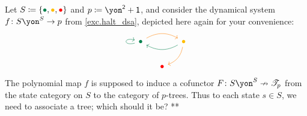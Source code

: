 \documentclass[Book-Poly]{subfiles}
\begin{document}
\begin{example}\label{ex.cofree_dyn_sys}
Let $S\coloneqq\{\bul[dgreen],\bul[dyellow],\bul[red]\}$ and $p\coloneqq\yon^\2+\1$, and consider the dynamical system $f\colon S\yon^S\to p$ from \cref{exc.halt_dsa}, depicted here again for your convenience:
\[
\begin{tikzcd}[column sep=small]
	\bul[dgreen]\ar[rr, bend left, orange]\ar[loop left, dgreen]&&
	\bul[dyellow]\ar[dl, bend left, orange]\ar[ll, dgreen, bend left]\\&
	\bul[red]
\end{tikzcd}
\]
The polynomial map $f$ is supposed to induce a cofunctor $F\colon S\yon^S\cof\cofree{p}$ from the state category on $S$ to the category of $p$-trees. Thus to each state $s\in S$, we need to associate a tree; which should it be? 
**
\end{example}




\end{document}
